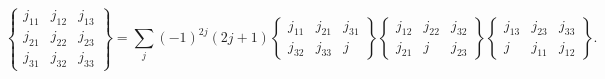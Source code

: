 \[\begin{Bmatrix}j_{11}&j_{12}&j_{13}\\
j_{21}&j_{22}&j_{23}\\
j_{31}&j_{32}&j_{33}\end{Bmatrix}=\sum_{j}(-1)^{2j}(2j+1)\begin{Bmatrix}j_{11}%
&j_{21}&j_{31}\\
j_{32}&j_{33}&j\end{Bmatrix}\begin{Bmatrix}j_{12}&j_{22}&j_{32}\\
j_{21}&j&j_{23}\end{Bmatrix}\begin{Bmatrix}j_{13}&j_{23}&j_{33}\\
j&j_{11}&j_{12}\end{Bmatrix}.\]